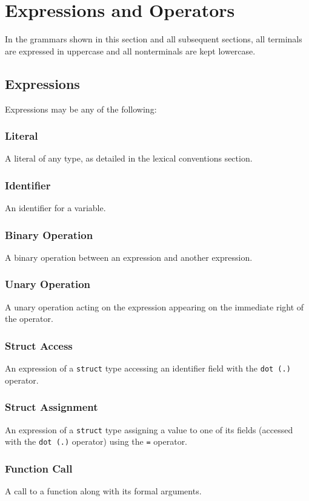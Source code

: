 \section{Expressions and Operators}
  In the grammars shown in this section and all subsequent sections, all terminals are expressed in uppercase and all nonterminals are kept lowercase. 

	\subsection{Expressions}
    Expressions may be any of the following:
    
    \subsubsection{Literal}
      A literal of any type, as detailed in the lexical conventions section.
    \subsubsection{Identifier}
      An identifier for a variable.
    \subsubsection{Binary Operation}
      A binary operation between an expression and another expression.
    \subsubsection{Unary Operation}
      A unary operation acting on the expression appearing on the immediate right of the operator.
    \subsubsection{Struct Access}
      An expression of a \texttt{struct} type accessing an identifier field with the \texttt{dot (.)} operator.
    \subsubsection{Struct Assignment}
      An expression of a \texttt{struct} type assigning a value to one of its fields (accessed with the \texttt{dot (.)} operator) using the \texttt{=} operator.
    \subsubsection{Function Call}
      A call to a function along with its formal arguments.
